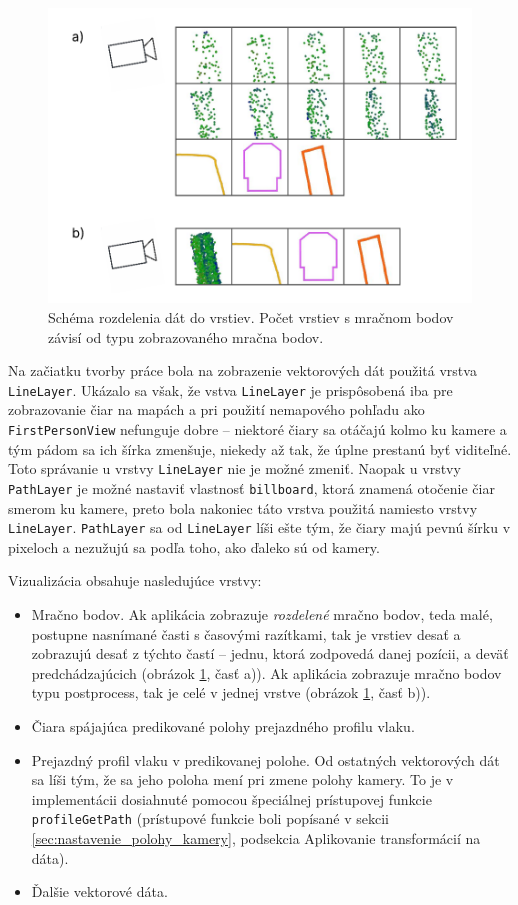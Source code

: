 \begin{figure}[h]
    \centering
    \includegraphics[width=0.8\linewidth]{text_prace/obrazky-figures/vrstvy.pdf}
    \caption{Schéma rozdelenia dát do vrstiev. Počet vrstiev s mračnom bodov závisí od typu zobrazovaného mračna bodov.}
    \label{fig:vrstvy}
\end{figure}

Na začiatku tvorby práce bola na zobrazenie vektorových dát použitá vrstva \texttt{LineLayer}. Ukázalo sa však, že vstva \texttt{LineLayer} je prispôsobená iba pre zobrazovanie čiar na mapách a pri použití nemapového pohľadu ako \texttt{FirstPersonView} nefunguje dobre -- niektoré čiary sa otáčajú kolmo ku kamere a tým pádom sa ich šírka zmenšuje, niekedy až tak, že úplne prestanú byť viditeľné. Toto správanie u vrstvy \texttt{LineLayer} nie je možné zmeniť. Naopak u vrstvy \texttt{PathLayer} je možné nastaviť vlastnosť \texttt{billboard}, ktorá znamená otočenie čiar smerom ku kamere, preto bola nakoniec táto vrstva použitá namiesto vrstvy \texttt{LineLayer}. \texttt{PathLayer} sa od \texttt{LineLayer} líši ešte tým, že čiary majú pevnú šírku v pixeloch a nezužujú sa podľa toho, ako ďaleko sú od kamery.

Vizualizácia obsahuje nasledujúce vrstvy:
\begin{itemize}
    \item Mračno bodov. Ak aplikácia zobrazuje \emph{rozdelené} mračno bodov, teda malé, postupne nasnímané časti s časovými razítkami, tak je vrstiev desať a zobrazujú desať z týchto častí -- jednu, ktorá zodpovedá danej pozícii, a deväť predchádzajúcich (obrázok \ref{fig:vrstvy}, časť a)). Ak aplikácia zobrazuje mračno bodov typu postprocess, tak je celé v jednej vrstve (obrázok \ref{fig:vrstvy}, časť b)).
    \item Čiara spájajúca predikované polohy prejazdného profilu vlaku.
    \item Prejazdný profil vlaku v predikovanej polohe. Od ostatných vektorových dát sa líši tým, že sa jeho poloha mení pri zmene polohy kamery. To je v implementácii dosiahnuté pomocou špeciálnej prístupovej funkcie \texttt{profileGetPath} (prístupové funkcie boli popísané v sekcii \ref{sec:nastavenie_polohy_kamery}, podsekcia Aplikovanie transformácií na dáta). 
    \item Ďalšie vektorové dáta.
\end{itemize}

